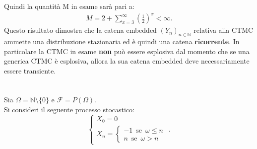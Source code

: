\documentclass[11pt,largemargins]{homework}
\begin{document}
\begin{alphaparts}
  Quindi la quantità M in esame sarà pari a:
  \begin{gather*}
    M = 2 +  \sum \limits_{x=3}^{\infty} \left(\frac{1}{2}\right)^x < \infty.
  \end{gather*}
  Questo risultato dimostra che la catena embedded \((Y_n)_{n \in \mathbb{N}}\) relativa alla CTMC ammette una distribuzione stazionaria ed è quindi una catena \textbf{ricorrente}. In particolare la CTMC in esame \textbf{non} può essere esplosiva dal momento che se una generica CTMC è esplosiva, allora la sua catena embedded deve necessariamente essere transiente.










  \end{alphaparts}
  
  
  \newpage
  \section{}%
  
  Sia $\Omega=\mathbb{N}\setminus \{0\}$ e $\mathcal{F}=P\left(\Omega\right)$.\\
  Si consideri il seguente processo stocastico:
  \begin{equation*}
  \begin{cases} X_{0}=0\\X_{n}=\begin{cases}-1 \,\,\, \text{se} \,\,\, \omega\leq n\\n \,\,\, \text{se} \,\,\, \omega> n\end{cases} \end{cases}.
  \end{equation*}
  
\end{document}
